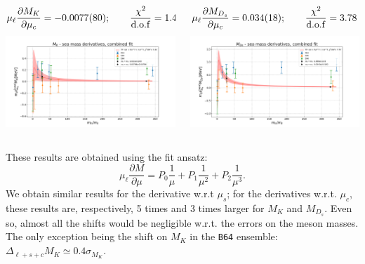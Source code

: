 \documentclass[xcolor={dvipsnames,table}]{beamer}
\begin{document}
\begin{frame}
  \begin{columns}
    \begin{column}{0.5\textwidth}
      {\small $$\mu_\ell \frac{\partial M_K}{\partial \mu_c} = -0.0077(80); \qquad\frac{\chi^2}{\rm d.o.f}= 1.44$$}
      \includegraphics[trim=0cm 0.5cm 0cm 1.3cm, clip,width=\textwidth]{plots/deco_fit_MK_der_mc_lin_term.png}
    \end{column}
    \begin{column}{0.5\textwidth}
      {\small $$\mu_\ell \frac{\partial M_{D_s}}{\partial \mu_c} = 0.034(18); \qquad\frac{\chi^2}{\rm d.o.f}= 3.78$$}
      \includegraphics[trim=0cm 0.5cm 0cm 1.3cm, clip,width=\textwidth]{plots/deco_fit_MD_der_mc_lin_term.png}
    \end{column}
  \end{columns}

  These results are obtained using the fit ansatz:
  \[
    \mu_\ell  \frac{\partial M }{\partial\mu} = P_0\frac{1}{\mu}+P_1\frac{1}{\mu^2}+P_2\frac{1}{\mu^3}.
  \]
  We obtain similar results for the derivative w.r.t $\mu_s$; for the derivatives w.r.t. $\mu_c$, these results are, respectively, 5 times and 3 times larger for $M_K$ and $M_{D_s}$. Even so, almost all the shifts would be negligible w.r.t. the errors on the meson masses. The only exception being the shift on $M_K$ in the \texttt{B64} ensemble: $\Delta_{\ell+s+c}M_K\simeq0.4\sigma_{M_K}$.
\end{frame}
\end{document}
